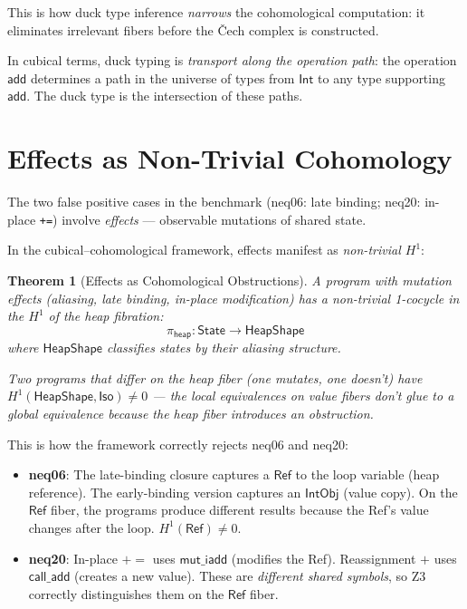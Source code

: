 \documentclass[11pt,a4paper]{report}
\theoremstyle{definition}
\theoremstyle{plain}
\newtheorem{theorem}[definition]{Theorem}
\newcommand{\Iso}{\mathsf{Iso}}
\newcommand{\Hone}{H^1}
\begin{document}
This is how duck type inference \emph{narrows} the cohomological
computation: it eliminates irrelevant fibers before the \v{C}ech
complex is constructed.

In cubical terms, duck typing is \emph{transport along the operation
path}: the operation $\mathsf{add}$ determines a path in the universe
of types from $\mathsf{Int}$ to any type supporting $\mathsf{add}$.
The duck type is the intersection of these paths.

\section{Effects as Non-Trivial Cohomology}

The two false positive cases in the benchmark (neq06: late binding;
neq20: in-place \texttt{+=}) involve \emph{effects} --- observable
mutations of shared state.

In the cubical--cohomological framework, effects manifest as
\emph{non-trivial $\Hone$}:

\begin{theorem}[Effects as Cohomological Obstructions]
\label{thm:effects}
A program with mutation effects (aliasing, late binding, in-place
modification) has a non-trivial 1-cocycle in the $\Hone$ of the
\emph{heap fibration}:
\[
  \pi_\mathsf{heap} : \mathsf{State} \to \mathsf{HeapShape}
\]
where $\mathsf{HeapShape}$ classifies states by their aliasing
structure.

Two programs that differ on the heap fiber (one mutates, one doesn't)
have $\Hone(\mathsf{HeapShape}, \Iso) \neq 0$ --- the local
equivalences on value fibers don't glue to a global equivalence
because the heap fiber introduces an obstruction.
\end{theorem}

This is how the framework correctly rejects neq06 and neq20:
\begin{itemize}
  \item \textbf{neq06}: The late-binding closure captures a
    $\mathsf{Ref}$ to the loop variable (heap reference).  The
    early-binding version captures an $\mathsf{IntObj}$ (value copy).
    On the $\mathsf{Ref}$ fiber, the programs produce different
    results because the Ref's value changes after the loop.
    $\Hone(\mathsf{Ref}) \neq 0$.
  \item \textbf{neq20}: In-place $\mathsf{+=}$ uses
    $\mathsf{mut\_iadd}$ (modifies the Ref).  Reassignment $+$ uses
    $\mathsf{call\_add}$ (creates a new value).  These are
    \emph{different shared symbols}, so Z3 correctly distinguishes
    them on the $\mathsf{Ref}$ fiber.
\end{itemize}
\end{document}

